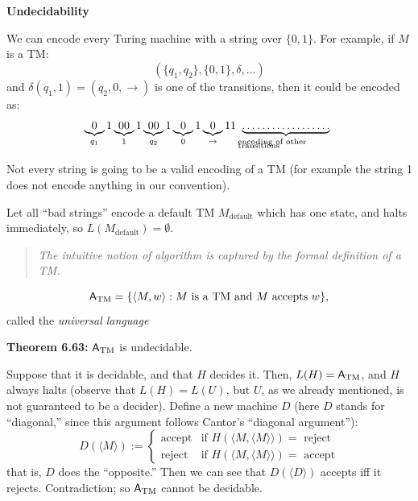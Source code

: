 \begin{frame}

{\bf Undecidability}

We can encode every Turing machine with a string over $\{0,1\}$.  For
example, if $M$ is a TM:
$$
(\{q_1,q_2\},\{0,1\},\delta,\ldots)
$$
and $\delta(q_1,1)=(q_2,0,\rightarrow)$ is one of the transitions,
then it could be encoded as:
$$
\underbrace{0}_{q_1}1
\underbrace{00}_11
\underbrace{00}_{q_2}1
\underbrace{0}_01
\underbrace{0}_\rightarrow11
\underbrace{\ldots\ldots\ldots\ldots\ldots\ldots}_{
\text{\begin{minipage}{3cm}encoding of other\\[-3mm]transitions\end{minipage}}}
$$

Not every string is going to be a valid encoding of a TM (for example
the string 1 does not encode anything in our convention).  

Let all ``bad strings'' encode a default TM $M_{\text{default}}$ which
has one state, and halts immediately, so
$L(M_{\text{default}})=\emptyset$.
\end{frame}

\begin{frame}

\begin{quote}
{\em The intuitive notion of algorithm is captured by the formal
definition of a TM.}
\end{quote}

$$
\mathsf{A}_{\mathrm{TM}}=\{\langle M,w\rangle:\text{$M$ is a TM and $M$ accepts
$w$}\},
$$
called the {\em universal language}
\end{frame}

\begin{frame}

{\bf Theorem 6.63:} $\mathsf{A}_{\mathrm{TM}}$ is undecidable.


Suppose that it is decidable, and that $H$ decides it.  Then,
$L(H)=\mathsf{A}_{\mathrm{TM}}$, and $H$ always halts (observe that $L(H)=L(U)$, but $U$,
as we already mentioned, is not guaranteed to be a decider).  Define a
new machine $D$ (here $D$ stands for ``diagonal,'' since this argument
follows Cantor's ``diagonal argument''):
$$
D(\langle M\rangle):=
\begin{cases}
\text{accept} & \text{if $H(\langle M,\langle M\rangle\rangle)=$ reject} \\
\text{reject} & \text{if $H(\langle M,\langle M\rangle\rangle)=$ accept}
\end{cases}
$$
that is, $D$ does the ``opposite.''  Then we can see that $D(\langle
D\rangle)$ accepts iff it rejects.  Contradiction; so $\mathsf{A}_{\mathrm{TM}}$ cannot be
decidable.

\end{frame}

